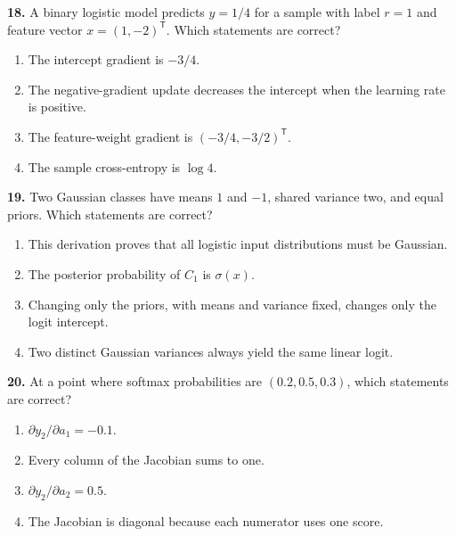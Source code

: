 \documentclass[11pt,a4paper]{article}
\begin{document}
\par\noindent\begin{minipage}{\linewidth}
\textbf{18.} A binary logistic model predicts \(y=1/4\) for a sample with label \(r=1\) and feature vector \(x=(1,-2)^{\mathsf T}\). Which statements are correct?
\begin{enumerate}[label=(\Alph*),leftmargin=8mm,itemsep=2pt,topsep=2pt]
\item The intercept gradient is \(-3/4\).
\item The negative-gradient update decreases the intercept when the learning rate is positive.
\item The feature-weight gradient is \((-3/4,-3/2)^{\mathsf T}\).
\item The sample cross-entropy is \(\log4\).
\end{enumerate}

\end{minipage}\par\vspace{3mm}
\par\noindent\begin{minipage}{\linewidth}
\textbf{19.} Two Gaussian classes have means \(1\) and \(-1\), shared variance two, and equal priors. Which statements are correct?
\begin{enumerate}[label=(\Alph*),leftmargin=8mm,itemsep=2pt,topsep=2pt]
\item This derivation proves that all logistic input distributions must be Gaussian.
\item The posterior probability of \(C_1\) is \(\sigma(x)\).
\item Changing only the priors, with means and variance fixed, changes only the logit intercept.
\item Two distinct Gaussian variances always yield the same linear logit.
\end{enumerate}

\end{minipage}\par\vspace{3mm}
\par\noindent\begin{minipage}{\linewidth}
\textbf{20.} At a point where softmax probabilities are \((0.2,0.5,0.3)\), which statements are correct?
\begin{enumerate}[label=(\Alph*),leftmargin=8mm,itemsep=2pt,topsep=2pt]
\item \(\partial y_2/\partial a_1=-0.1\).
\item Every column of the Jacobian sums to one.
\item \(\partial y_2/\partial a_2=0.5\).
\item The Jacobian is diagonal because each numerator uses one score.
\end{enumerate}

\end{minipage}\par\vspace{3mm}
\end{document}
